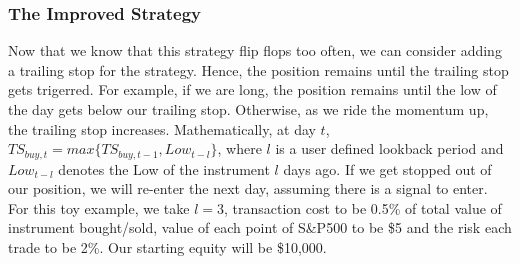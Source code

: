 \documentclass[12pt]{article}
\theoremstyle{definition}
\begin{document}
\subsubsection{The Improved Strategy}
Now that we know that this strategy flip flops too often, we can consider adding a trailing stop for the strategy. Hence, the position remains until the trailing stop gets trigerred. For example, if we are long, the position remains until the low of the day gets below our trailing stop. Otherwise, as we ride the momentum up, the trailing stop increases. Mathematically, at day $t$, $TS_{buy,t} = max\{TS_{buy,t-1},Low_{t-l}\}$, where $l$ is a user defined lookback period and $Low_{t-l}$ denotes the Low of the instrument $l$ days ago. If we get stopped out of our position, we will re-enter the next day, assuming there is a signal to enter. For this toy example, we take $l=3$, transaction cost to be 0.5\% of total value of instrument bought/sold, value of each point of S\&P500 to be \$5 and the risk each trade to be 2\%. Our starting equity will be \$10,000.
\end{document}
